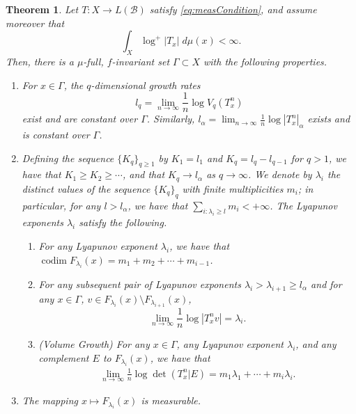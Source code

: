 \documentclass[11pt]{amsart}
\theoremstyle{theorem}
\newtheorem{thm}{Theorem}[section]
\theoremstyle{definition}
\numberwithin{equation}{section}
\renewcommand{\a}{\alpha}
\renewcommand{\l}{\lambda}
\newcommand{\Bc}{\mathcal{B}}
\newcommand{\codim}{\operatorname{codim}}
\begin{document}
\begin{thm} \label{thm:volMET}
Let $T: X \to L(\Bc)$ satisfy \eqref{eq:measCondition}, and assume moreover that
\[\int_X \log^+ |T_x| \; d \mu(x) < \infty.\]
Then, there is a $\mu$-full, $f$-invariant set $\Gamma \subset X$ with the following properties.
\begin{enumerate}
\item For $x \in \Gamma$, the $q$-dimensional growth rates
\[
l_q = \lim_{n \to \infty} \frac{1}{n} \log V_q(T^n_x)
\]
exist and are constant over $\Gamma$. Similarly, $l_{\a} = \lim_{n \to \infty} \frac{1}{n} \log |T^n_x|_{\a}$ exists and is constant over $\Gamma$.
\item Defining the sequence $\{K_q\}_{q \geq 1}$ by $K_1 = l_1$ and $K_q = l_q - l_{q - 1}$ for $q > 1$, we have that $K_1 \geq K_2 \geq \cdots$, and that $K_q \to l_{\a}$ as $q \to \infty$. We denote by $\l_i$ the distinct values of the sequence $\{K_q\}_q$ with finite multiplicities $m_i$; in particular, for any $l > l_\a$, we have that $\sum_{i : \l_i \geq l} m_i < + \infty$. The Lyapunov exponents $\l_i$ satisfy the following.
\begin{enumerate}
\item For any Lyapunov exponent $\l_i$, we have that $\codim F_{\l_i}(x) = m_1 + m_2 + \cdots + m_{i -1}$.
\item For any subsequent pair of Lyapunov exponents $\l_i > \l_{i + 1} \geq l_{\a}$ and for any $x \in \Gamma$, $v \in F_{\l_i}(x) \setminus F_{\l_{i + 1}}(x)$,
\[
\lim_{n \to \infty} \frac{1}{n} \log |T^n_x v| = \l_i.
\]
\item (Volume Growth) For any $x \in \Gamma$, any Lyapunov exponent $\l_i$, and any complement $E$ to $F_{\l_i}(x)$, we have that
\begin{align}\label{eq:correctVolGrow}
\lim_{n \to \infty} \frac{1}{n} \log \det(T^n_x | E) = m_1 \l_1 + \cdots + m_i \l_i.
\end{align}
\end{enumerate}
\item The mapping $x \mapsto F_{\l_i}(x)$ is measurable.
\end{enumerate}
\end{thm}
\end{document}
